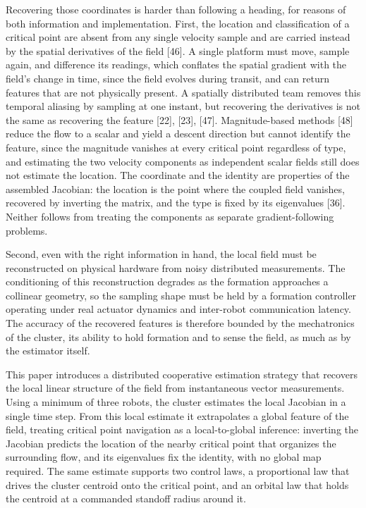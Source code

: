 \documentclass[lettersize,journal]{IEEEtran}
\begin{document}
Recovering those coordinates is harder than following a heading, for reasons of both information and implementation. First, the location and classification of a critical point are absent from any single velocity sample and are carried instead by the spatial derivatives of the field [46]. A single platform must move, sample again, and difference its readings, which conflates the spatial gradient with the field's change in time, since the field evolves during transit, and can return features that are not physically present. A spatially distributed team removes this temporal aliasing by sampling at one instant, but recovering the derivatives is not the same as recovering the feature [22], [23], [47]. Magnitude-based methods [48] reduce the flow to a scalar and yield a descent direction but cannot identify the feature, since the magnitude vanishes at every critical point regardless of type, and estimating the two velocity components as independent scalar fields still does not estimate the location. The coordinate and the identity are properties of the assembled Jacobian: the location is the point where the coupled field vanishes, recovered by inverting the matrix, and the type is fixed by its eigenvalues [36]. Neither follows from treating the components as separate gradient-following problems.

Second, even with the right information in hand, the local field must be reconstructed on physical hardware from noisy distributed measurements. The conditioning of this reconstruction degrades as the formation approaches a collinear geometry, so the sampling shape must be held by a formation controller operating under real actuator dynamics and inter-robot communication latency. The accuracy of the recovered features is therefore bounded by the mechatronics of the cluster, its ability to hold formation and to sense the field, as much as by the estimator itself.

This paper introduces a distributed cooperative estimation strategy that recovers the local linear structure of the field from instantaneous vector measurements. Using a minimum of three robots, the cluster estimates the local Jacobian in a single time step. From this local estimate it extrapolates a global feature of the field, treating critical point navigation as a local-to-global inference: inverting the Jacobian predicts the location of the nearby critical point that organizes the surrounding flow, and its eigenvalues fix the identity, with no global map required. The same estimate supports two control laws, a proportional law that drives the cluster centroid onto the critical point, and an orbital law that holds the centroid at a commanded standoff radius around it.
\end{document}
